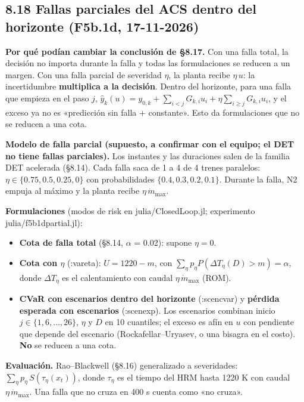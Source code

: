 \documentclass[11pt,a4paper]{article}
\newcommand{\codeus}{\textunderscore\allowbreak}
\newcommand{\code}[1]{{\small\ttfamily\let\_\codeus #1}}
\begin{document}
\subsection*{8.18 Fallas parciales del ACS dentro del horizonte (F5b.1d, 17-11-2026)}
\textbf{Por qué podían cambiar la conclusión de \S{}8.17.} Con una falla total, la decisión no importa durante la falla y todas las formulaciones se reducen a un margen. Con una falla parcial de severidad $\eta$, la planta recibe $\eta\,u$: la incertidumbre \textbf{multiplica a la decisión}. Dentro del horizonte, para una falla que empieza en el paso $j$, $\hat y_k(u)=y_{0,k}+\sum_{i<j}G_{k,i}u_i+\eta\sum_{i\ge j}G_{k,i}u_i$, y el exceso ya no es «predicción sin falla + constante». Esto da formulaciones que no se reducen a una cota.

\textbf{Modelo de falla parcial (supuesto, a confirmar con el equipo; el DET no tiene fallas parciales).} Los instantes y las duraciones salen de la familia DET acelerada (\S{}8.14). Cada falla saca de 1 a 4 de 4 trenes paralelos: $\eta\in\{0.75,0.5,0.25,0\}$ con probabilidades $\{0.4,0.3,0.2,0.1\}$. Durante la falla, N2 empuja al máximo y la planta recibe $\eta\,\dot m_{\max}$.

\textbf{Formulaciones} (modos de \code{risk} en \code{julia/ClosedLoop.jl}; experimento \code{julia/f5b1d\_partial.jl}):

\begin{itemize}
\item \textbf{Cota de falla total} (\S{}8.14, $\alpha$ = 0.02): supone $\eta=0$.
\item \textbf{Cota con $\eta$} (\code{:var\_eta}): $U=1220-m$, con $\sum_\eta p_\eta P(\Delta T_\eta(D)>m)=\alpha$, donde $\Delta T_\eta$ es el calentamiento con caudal $\eta\,\dot m_{\max}$ (ROM).
\item \textbf{CVaR con escenarios dentro del horizonte} (\code{:scen\_cvar}) y \textbf{pérdida esperada con escenarios} (\code{:scen\_exp}). Los escenarios combinan inicio $j\in\{1,6,\dots,26\}$, $\eta$ y $D$ en 10 cuantiles; el exceso es afín en $u$ con pendiente que depende del escenario (Rockafellar–Uryasev, o una bisagra en el costo). \textbf{No} se reducen a una cota.
\end{itemize}

\textbf{Evaluación.} Rao–Blackwell (\S{}8.16) generalizado a severidades: $\sum_\eta p_\eta\,S(\tau_\eta(x_t))$, donde $\tau_\eta$ es el tiempo del HRM hasta 1220 K con caudal $\eta\,\dot m_{\max}$. Una falla que no cruza en 400 s cuenta como «no cruza».
\end{document}
